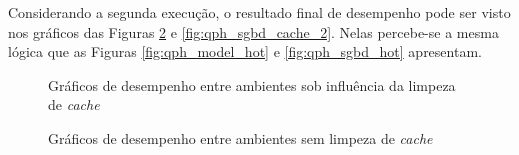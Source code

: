 Considerando a segunda execução, o resultado final de desempenho pode ser visto nos gráficos das Figuras \ref{fig:qph_model_cache_2} e \ref{fig:qph_sgbd_cache_2}. Nelas percebe-se a mesma lógica que as Figuras \ref{fig:qph_model_hot} e \ref{fig:qph_sgbd_hot} apresentam.

\begin{figure}[htpb]
        \centering
        \caption{Gráficos de desempenho entre ambientes sob influência da limpeza de \textit{cache}}
        \label{fig:qph_model_cache}
\end{figure}

\begin{figure}[htpb]
        \centering
        \caption{Gráficos de desempenho entre ambientes sem limpeza de \textit{cache}}
        \label{fig:qph_model_cache_2}
\end{figure}

